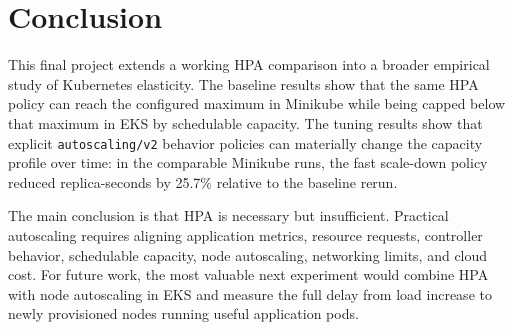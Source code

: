 \documentclass[conference]{IEEEtran}
\begin{document}
\section{Conclusion}

This final project extends a working HPA comparison into a broader empirical study of Kubernetes elasticity. The baseline results show that the same HPA policy can reach the configured maximum in Minikube while being capped below that maximum in EKS by schedulable capacity. The tuning results show that explicit \texttt{autoscaling/v2} behavior policies can materially change the capacity profile over time: in the comparable Minikube runs, the fast scale-down policy reduced replica-seconds by 25.7\% relative to the baseline rerun.

The main conclusion is that HPA is necessary but insufficient. Practical autoscaling requires aligning application metrics, resource requests, controller behavior, schedulable capacity, node autoscaling, networking limits, and cloud cost. For future work, the most valuable next experiment would combine HPA with node autoscaling in EKS and measure the full delay from load increase to newly provisioned nodes running useful application pods.



\end{document}
